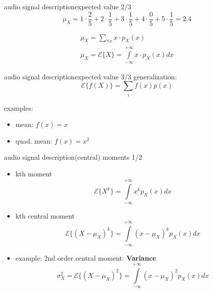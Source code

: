 \begin{frame}{audio signal description}{expected value 2/3}
	\begin{equation*}
		\mu_X = 1\cdot\frac{2}{5} + 2\cdot\frac{1}{5} + 3\cdot\frac{1}{5} + 4\cdot\frac{0}{5} + 5\cdot\frac{1}{5} = 2.4
	\end{equation*}
	
	\pause
	\begin{eqnarray*}
		\mu_X 	= \sum\limits_{\forall x} x\cdot p_X(x)\\
		\mu_X=\mathcal{E}\lbrace   X\rbrace  =\int\limits_{-\infty}^{+\infty}x\cdot p_X(x)dx
	\end{eqnarray*}
\end{frame}		
\begin{frame}{audio signal description}{expected value 3/3}
	generalization:
	\begin{equation*}
		\mathcal{E}\lbrace   f(X)\rbrace  = \sum\limits_i f(x)p(x)
	\end{equation*}

	\pause
	examples:
	\begin{itemize}
		\item	mean: $f(x) = x$
		\item	quad. mean: $f(x) = x^2$
	\end{itemize}
\end{frame}		

\begin{frame}{audio signal description}{(central) moments 1/2}
	\begin{itemize}
		\item	kth moment
			\begin{equation*}
				\mathcal{E}\lbrace  X^k\rbrace  = \int\limits_{-\infty}^{+\infty}x^kp_X(x)dx
			\end{equation*}
		\pause
		\item kth central moment
			\begin{equation*}
				\mathcal{E}\lbrace  (X-\mu_X)^k\rbrace  = \int\limits_{-\infty}^{+\infty}(x-\mu_X)^k p_X(x)dx
			\end{equation*}

		\pause
		\item	example: 2nd order central moment: \textbf{Variance}
			\begin{equation*}
				\sigma_X^2 = \mathcal{E}\lbrace  (X-\mu_X)^2\rbrace  = \int\limits_{-\infty}^{+\infty}(x-\mu_X)^2 p_X(x)dx
			\end{equation*}
	\end{itemize}
\end{frame}		

